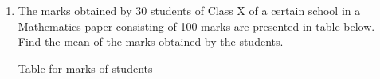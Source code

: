 \renewcommand{\theequation}{\theenumi}
\begin{enumerate}[label=\arabic*.,ref=\thesubsection.\theenumi]
\item The marks obtained by 30 students of Class X of a certain school in a Mathematics paper consisting of 100 marks are presented in table below. Find the mean of the marks obtained by the students.\\
\begin{table}[!ht]
	\centering
	
	\caption{ Table for marks of students}
\end{table}
\end{enumerate}